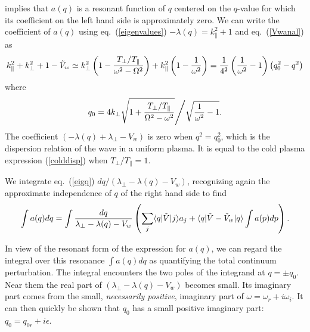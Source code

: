 \documentclass{jpp}
\def\ket#1{|#1\rangle}
\def\bra#1{\langle#1}
\begin{document}
implies that $a(q)$ is a resonant function of $q$ centered on the
$q$-value for which its coefficient on the left hand side is
approximately zero. We can write the coefficient of $a(q)$ using eq.\
(\ref{eigenvalues}) $-\lambda(q)=k_\parallel^2+1$ and eq.\
(\ref{Vwanal}) as
\begin{equation}
  \label{}
  k_\parallel^2+k_\perp^2+1-\tilde
  V_w\simeq k_\perp^2\left(1-{T_\perp/T_\parallel\over\omega^2-\Omega^2}\right)
  +k_\parallel^2\left(1-{1\over\omega^2}\right)
= {1\over4^2}\left({1\over\omega^2}-1\right)\left(q_0^2-q^2\right)
\end{equation}
where
\begin{equation}
  \label{q0def}
  q_0=4k_\perp\sqrt{1+{T_\perp/T_\parallel\over\Omega^2-\omega^2}}
  \Bigg/\sqrt{{1\over\omega^2}-1}.
\end{equation}
The coefficient $(-\lambda(q)+\lambda_\perp-V_w) $ is zero when
$q^2=q_0^2$, which is the dispersion relation of the wave
in a uniform plasma. It is equal to the cold plasma expression
(\ref{colddisp}) when $T_\perp/T_\parallel=1$.



We integrate eq.\ (\ref{eigq})  $dq/(\lambda_\perp-\lambda(q)-V_w)$, recognizing again the approximate independence of $q$ of
the right hand side to find
\begin{equation}
  \label{eigqint}
  \int a(q) dq =\int {dq\over \lambda_\perp-\lambda(q)-V_w}
  \left(\sum_j\bra{q}|\tilde{V}\ket{j}a_j
+\bra{q}|\tilde V-\tilde V_w\ket{q}\int a(p)dp \right).
\end{equation}

In view of the resonant form of the expression for $a(q)$, we can
regard the integral over this resonance $\int a(q) dq$ as quantifying
the total continuum perturbation.  The integral encounters the two
poles of the integrand at $q=\pm q_0$.
Near them the real part of $(\lambda_\perp-\lambda(q)-V_w)$ becomes small. Its
imaginary part comes from the small, \emph{necessarily positive},
imaginary part of
$\omega=\omega_r+i\omega_i$. It can then quickly be shown that
$q_0$ has a small positive imaginary part: $q_0=q_{0r}+i\epsilon$.
\end{document}
